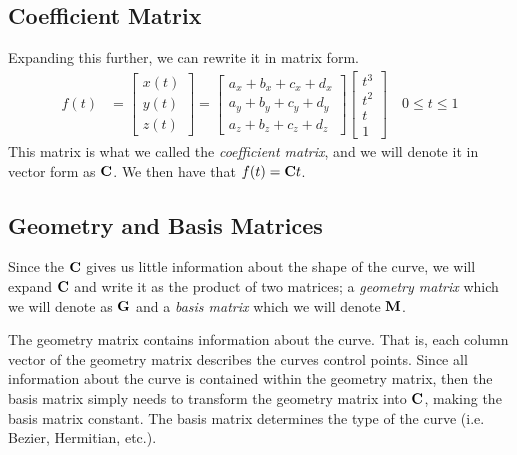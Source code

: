 \documentclass[11pt]{article}
\newcommand{\mat}[1]{\text{\bf #1}}
\begin{document}
\subsection{Coefficient Matrix}
Expanding this further, we can rewrite it in matrix form.
\begin{align}
    f(t) &=
    \begin{bmatrix}
        x(t) \\
        y(t) \\
        z(t)
    \end{bmatrix}
    =
    \begin{bmatrix}
        a_x + b_x + c_x + d_x \\
        a_y + b_y + c_y + d_y \\
        a_z + b_z + c_z + d_z
    \end{bmatrix}
    \begin{bmatrix}
        t^3 \\
        t^2 \\
        t   \\
        1
    \end{bmatrix}
    \quad
    0 \leq t \leq 1
\end{align}
This matrix is what we called the {\it coefficient matrix}, and we will denote
it in vector form as $\mat{C}$. We then have that $f(t) = \mat{C}t$.

\subsection{Geometry and Basis Matrices}
Since the $\mat{C}$ gives us little information about the shape of the curve,
we will expand $\mat{C}$ and write it as the product of two matrices; a {\it
geometry matrix} which we will denote as $\mat{G}$ and a {\it basis matrix}
which we will denote $\mat{M}$.

The geometry matrix contains information about the curve. That is, each column
vector of the geometry matrix describes the curves control points. Since all
information about the curve is contained within the geometry matrix, then the
basis matrix simply needs to transform the geometry matrix into $\mat{C}$,
making the basis matrix constant. The basis matrix determines the type of the
curve (i.e. Bezier, Hermitian, etc.).
\end{document}

